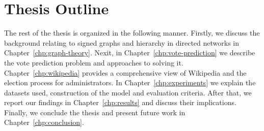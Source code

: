 \section{Thesis Outline}
The rest of the thesis is organized in the following manner. Firstly, we discuss the background relating to signed graphs and hierarchy in directed networks in Chapter~\ref{chp:graph-theory}. Nexit, in Chapter~\ref{chp:vote-prediction} we describe the vote prediction problem and approaches to solving it. Chapter~\ref{chp:wikipedia} provides a comprehensive view of Wikipedia and the election process for administrators. In Chapter~\ref{chp:experiments} we explain the datasets used, construction of the model and evaluation criteria. After that, we report our findings in Chapter~\ref{chp:results} and discuss their implications. Finally, we conclude the thesis and present future work in Chapter~\ref{chp:conclusion}.